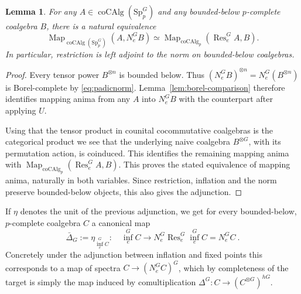 \documentclass[11pt,a4paper]{article}
\newtheorem{lemma}[thm]{Lemma}
\theoremstyle{definition}
\newcommand{\Sp}{\mathrm{Sp}}
\newcommand{\Res}{\operatorname{Res}}
\newcommand{\coAlg}{\operatorname{coCAlg}}
\newcommand{\Map}{\operatorname{Map}}
\newcommand{\id}{\mathrm{id}}
\newcommand{\infl}{\operatorname{inf}}
\begin{document}
\begin{lemma}\label{lem:lift} 
For any $A\in\coAlg(\Sp_p^G)$ and any bounded-below $p$-complete coalgebra
$B$, there is a natural equivalence
\[
 \Map_{\coAlg(\Sp_p^G)}(A,N_e^GB)
 \simeq
 \Map_{\coAlg_p}(\Res_e^G A,B).
\]
In particular, restriction is left adjoint to the norm on
bounded-below coalgebras. 
%
\end{lemma}
\begin{proof}
Every tensor power $B^{\otimes n}$ is bounded below.
Thus $(N_e^GB)^{\otimes n} = N_e^G(B^{\otimes n})$
is Borel-complete by \eqref{eq:padicnorm}. Lemma~\ref{lem:borel-comparison} therefore identifies mapping
anima from any $A$ into $N_e^GB$ with the counterpart after applying $U$.

Using that the tensor product in counital cocommutative coalgebras is the  categorical
product we see that the underlying naive coalgebra $B^{\otimes G}$, with
its permutation action, is coinduced. This identifies the remaining mapping anima
with $\Map_{\coAlg_p}(\Res_e^G A,B)$.
This proves the stated equivalence of mapping anima, naturally in both variables.
Since restriction, inflation and the norm preserve bounded-below objects, this also gives the adjunction.
%
\end{proof}

If $\eta$ denotes the unit of the previous adjunction, we get for every bounded-below, $p$-complete coalgebra $C$ a canonical map 
\[
 \bar{\Delta}_G:=\eta_{\infl_e^G C}: \quad 
 \infl_e^G C\longrightarrow
 N_e^G\Res_e^G\infl_e^G C
= N_e^G C \ .
\]
Concretely under the adjunction between inflation and fixed points this corresponds to a map of spectra $C \to  (N_e^GC)^G$, which by completeness of the target is simply the map induced by comultiplication $\Delta^G: C \to (C^{\otimes G})^{hG}$. 
\end{document}

